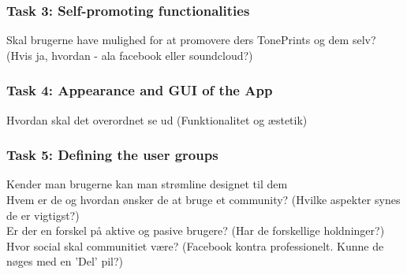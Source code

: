 \subsubsection{Task 3: Self-promoting functionalities}
\label{Task3}
Skal brugerne have mulighed for at promovere ders TonePrints og dem selv? (Hvis ja, hvordan - ala facebook eller soundcloud?)

\subsubsection{Task 4: Appearance and GUI of the App}
\label{Task4}
Hvordan skal det overordnet se ud (Funktionalitet og æstetik)

\subsubsection{Task 5: Defining the user groups}
\label{Task5}
Kender man brugerne kan man strømline designet til dem\\
Hvem er de og hvordan ønsker de at bruge et community? (Hvilke aspekter synes de er vigtigst?)\\
Er der en forskel på aktive og pasive brugere? (Har de forskellige holdninger?)\\
Hvor social skal communitiet være? (Facebook kontra professionelt. Kunne de nøges med en 'Del' pil?)

